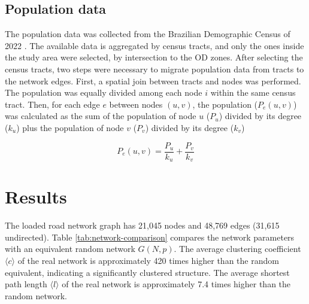 \documentclass{pssbmac}
\begin{document}
\subsection{Population data}

The population data was collected from the Brazilian Demographic Census of 2022 \cite{ibgeCensoDemografico20222022}. The available data is aggregated by census tracts, and only the ones inside the study area were selected, by intersection to the OD zones. After selecting the census tracts, two steps were necessary to migrate population data from tracts to the network edges. First, a spatial join between tracts and nodes was performed. The population was equally divided among each node $i$ within the same census tract. Then, for each edge $e$ between nodes $(u, v)$, the population ($P_e(u, v)$) was calculated as the sum of the population of node $u$ ($P_u$) divided by its degree ($k_u$) plus the population of node $v$ ($P_v$) divided by its degree ($k_v$)

\begin{equation}
P_e(u, v) = \frac{P_u}{k_u} + \frac{P_v}{k_v} \label{eq:pop}
\end{equation}



\section{Results}

The loaded road network graph has 21,045 nodes and 48,769 edges (31,615 undirected). Table \ref{tab:network-comparison} compares the network parameters with an equivalent random network $G(N, p)$. The average clustering coefficient $\langle c \rangle$ of the real network is approximately 420 times higher than the random equivalent, indicating a significantly clustered structure. The average shortest path length $\langle l \rangle$ of the real network is approximately 7.4 times higher than the random network.
\end{document}

